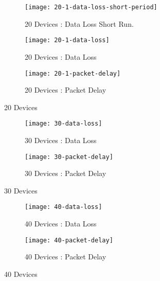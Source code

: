 \begin{center}
    \begin{figure}[p]
        \begin{subfigure}{1\textwidth}
            \centering
            \texttt{[image: 20-1-data-loss-short-period]}
            \caption{20 Devices : Data Loss Short Run.}
            \label{fig:20-D-DLSR}
        \end{subfigure}
        \begin{subfigure}{1\textwidth}
            \centering
            \texttt{[image: 20-1-data-loss]}
            \caption{20 Devices : Data Loss}
            \label{fig:20-D-DL}
        \end{subfigure}
        \begin{subfigure}{1\textwidth}
            \centering
            \texttt{[image: 20-1-packet-delay]}
            \caption{20 Devices : Packet Delay}
            \label{fig:20-D-PD}
        \end{subfigure}
        \caption{20 Devices}
    \end{figure}
    \begin{figure}[p]
        \begin{subfigure}{1\textwidth}
            \centering
            \texttt{[image: 30-data-loss]}
            \caption{30 Devices : Data Loss}
            \label{fig:30-D-DL}
        \end{subfigure}
        \begin{subfigure}{1\textwidth}
            \centering
            \texttt{[image: 30-packet-delay]}
            \caption{30 Devices : Packet Delay}
            \label{fig:30-D-PD}
        \end{subfigure}
        \caption{30 Devices}
    \end{figure}
    \begin{figure}[p]
        \begin{subfigure}{1\textwidth}
            \centering
            \texttt{[image: 40-data-loss]}
            \caption{40 Devices : Data Loss}
            \label{fig:40-D-DL}
        \end{subfigure}
        \begin{subfigure}{1\textwidth}
            \centering
            \texttt{[image: 40-packet-delay]}
            \caption{40 Devices : Packet Delay}
            \label{fig:40-D-PD}
        \end{subfigure}
        \caption{40 Devices}
    \end{figure}
\end{center}
